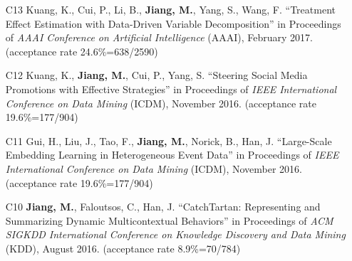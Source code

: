 \documentclass[10pt]{article}
\newenvironment{myindentpar}[1]%
{\begin{list}{}%
         {\setlength{\leftmargin}{#1}}%
         \item[]%
}
{\end{list}}
\newcounter{list}
\begin{document}
\begin{myindentpar}{0.00cm}
\begin{enumerate}[leftmargin=.5cm]
\vspace{-0.1cm}

\item[C13] Kuang, K., Cui, P., Li, B., \textbf{Jiang, M.}, Yang, S., Wang, F. ``Treatment Effect Estimation with Data-Driven Variable Decomposition'' in Proceedings of \emph{AAAI Conference on Artificial Intelligence} (AAAI), February 2017. (acceptance rate 24.6\%=638/2590)

\vspace{-0.1cm}

\item[C12] Kuang, K., \textbf{Jiang, M.}, Cui, P., Yang, S. ``Steering Social Media Promotions with Effective Strategies'' in Proceedings of \emph{IEEE International Conference on Data Mining} (ICDM), November 2016. (acceptance rate 19.6\%=177/904)

\vspace{-0.1cm}

\item[C11] Gui, H., Liu, J., Tao, F., \textbf{Jiang, M.}, Norick, B., Han, J. ``Large-Scale Embedding Learning in Heterogeneous Event Data'' in Proceedings of \emph{IEEE International Conference on Data Mining} (ICDM), November 2016. (acceptance rate 19.6\%=177/904)

\vspace{-0.1cm}

\item[C10] \textbf{Jiang, M.}, Faloutsos, C., Han, J. ``CatchTartan: Representing and Summarizing Dynamic Multicontextual Behaviors'' in Proceedings of \emph{ACM SIGKDD International Conference on Knowledge Discovery and Data Mining} (KDD), August 2016. (acceptance rate 8.9\%=70/784)


\end{enumerate}
\end{myindentpar}
\end{document}
